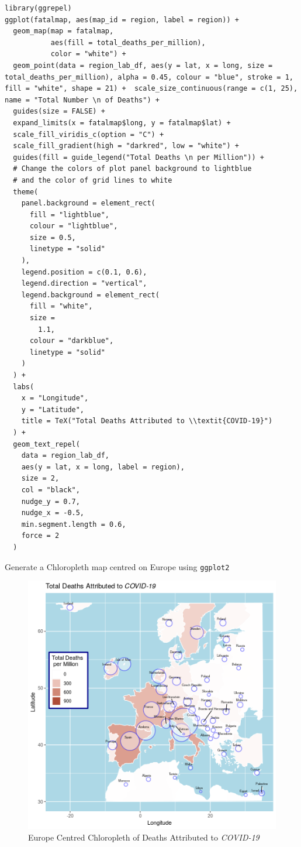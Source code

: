 \documentclass[11pt]{article}
\begin{document}
\begin{listing}[htbp]
\begin{verbatim}
library(ggrepel)
ggplot(fatalmap, aes(map_id = region, label = region)) +
  geom_map(map = fatalmap,
           aes(fill = total_deaths_per_million),
           color = "white") +
  geom_point(data = region_lab_df, aes(y = lat, x = long, size = total_deaths_per_million), alpha = 0.45, colour = "blue", stroke = 1, fill = "white", shape = 21) +  scale_size_continuous(range = c(1, 25), name = "Total Number \n of Deaths") +
  guides(size = FALSE) +
  expand_limits(x = fatalmap$long, y = fatalmap$lat) +
  scale_fill_viridis_c(option = "C") +
  scale_fill_gradient(high = "darkred", low = "white") +
  guides(fill = guide_legend("Total Deaths \n per Million")) +
  # Change the colors of plot panel background to lightblue
  # and the color of grid lines to white
  theme(
    panel.background = element_rect(
      fill = "lightblue",
      colour = "lightblue",
      size = 0.5,
      linetype = "solid"
    ),
    legend.position = c(0.1, 0.6),
    legend.direction = "vertical",
    legend.background = element_rect(
      fill = "white",
      size =
        1.1,
      colour = "darkblue",
      linetype = "solid"
    )
  ) +
  labs(
    x = "Longitude",
    y = "Latitude",
    title = TeX("Total Deaths Attributed to \\textit{COVID-19}")
  ) +
  geom_text_repel(
    data = region_lab_df,
    aes(y = lat, x = long, label = region),
    size = 2,
    col = "black",
    nudge_y = 0.7,
    nudge_x = -0.5,
    min.segment.length = 0.6,
    force = 2
  )
\end{verbatim}
\caption{\label{orgf7a336d}Generate a Chloropleth map centred on Europe using \texttt{ggplot2}}
\end{listing}


\begin{figure}[htbp]
\centering
\includegraphics[width=16cm]{SecChEur.png}
\caption{\label{fig:org8276add}Europe Centred Chloropleth of Deaths Attributed to \emph{COVID-19}}
\end{figure}
\end{document}

